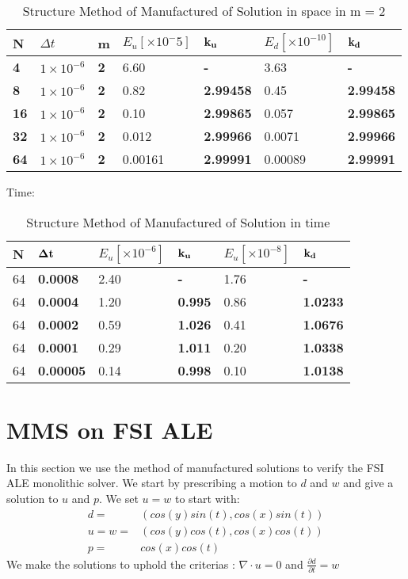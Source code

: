 \begin{table}[H]
\centering
\caption{Structure Method of Manufactured of Solution in space in m = 2}
\label{my-label}
\begin{tabular}{|l|l|l|l|l|l|l|}
\hline
\textbf{N} & $\Delta t$ & \textbf{m} & $E_u [\times 10^-5]$ & $\bold{k_u}$ & $E_d [\times 10^{-10}]$ & $\bold{k_d}$ \\ \hline
\textbf{4} & $1\times10^{-6}$ & \textbf{2} & 6.60 & \textbf{-} & 3.63 & \textbf{-} \\ \hline
\textbf{8} & $1\times10^{-6}$ & \textbf{2} & 0.82 & \textbf{2.99458} & 0.45 & \textbf{2.99458} \\ \hline
\textbf{16} & $1\times10^{-6}$ & \textbf{2} & 0.10 & \textbf{2.99865} & 0.057 & \textbf{2.99865} \\ \hline
\textbf{32} & $1\times10^{-6}$ & \textbf{2} & 0.012 & \textbf{2.99966} & 0.0071 & \textbf{2.99966} \\ \hline
\textbf{64} & $1\times10^{-6}$ & \textbf{2} & 0.00161 & \textbf{2.99991} & 0.00089 & \textbf{2.99991} \\ \hline
\end{tabular}
\end{table}



Time:
\begin{table}[H]
\centering
\caption{Structure Method of Manufactured of Solution in time}
\label{my-label}
\begin{tabular}{|l|l|l|l|l|l|}
\hline
N & $\bold{\Delta t}$ & $E_u [\times10^{-6}]$ & $\bold{k_u}$ & $E_u [\times10^{-8}]$ & $\bold{k_d}$ \\ \hline
64 & \textbf{0.0008} & 2.40 & \textbf{-} & 1.76 & \textbf{-} \\ \hline
64 & \textbf{0.0004} & 1.20 & \textbf{0.995} & 0.86 & \textbf{1.0233} \\ \hline
64 & \textbf{0.0002} & 0.59 & \textbf{1.026} & 0.41 & \textbf{1.0676} \\ \hline
64 & \textbf{0.0001} & 0.29 & \textbf{1.011} & 0.20 & \textbf{1.0338} \\ \hline
64 & \textbf{0.00005} & 0.14 & \textbf{0.998} & 0.10 & \textbf{1.0138} \\ \hline
\end{tabular}
\end{table}


\section{MMS on FSI ALE}
In this section we use the method of manufactured solutions to verify the FSI ALE monolithic solver. We start by prescribing a motion to $ d$ and $w$ and give a solution to $u$ and $p$. We set $u = w$ to start with:
\begin{align*}
d =& ( cos(y)sin(t) , cos(x)sin(t) )\\
u = w=& ( cos(y)cos(t), cos(x)cos(t) ) \\
p =& cos(x)cos(t)
\end{align*}
We make the solutions to uphold the criterias : $ \nabla \cdot u =0  $ and $ \frac{\partial d}{\partial t} = w  $ \\

